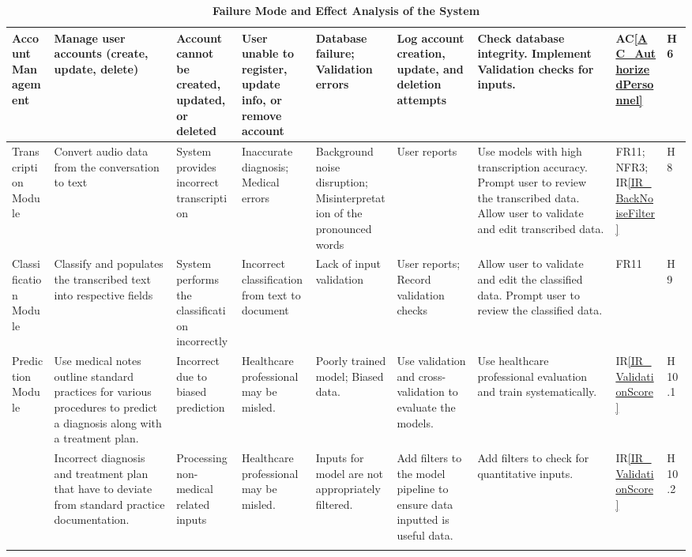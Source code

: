 \documentclass{article}
\begin{document}
\begin{landscape}
\begin{longtable}{|p{1.5cm}|p{2cm}|p{2.6cm}|p{2cm}|p{2cm}|p{2cm}|p{3.5cm}|p{1cm}|p{0.8cm}|}
        \midrule
        Account Management & \raggedright Manage user accounts (create, update, delete) & \raggedright Account cannot be created, updated, or deleted & \raggedright User unable to register, update info, or remove account & \raggedright Database failure; Validation errors & \raggedright Log account creation, update, and deletion attempts & \raggedright Check database integrity. Implement Validation checks for inputs. & AC\ref{AC_AuthorizedPersonnel} & H6 \\ 
        \midrule
        Transcription Module & \raggedright Convert audio data from the conversation to text & \raggedright System provides incorrect transcription & \raggedright Inaccurate diagnosis; Medical errors & \raggedright Background noise disruption; Misinterpretation of the pronounced words & \raggedright User reports & \raggedright Use models with high transcription accuracy. Prompt user to review the transcribed data. Allow user to validate and edit transcribed data. & FR11; NFR3; IR\ref{IR_BackNoiseFilter} & H8 \\ 
        \midrule
        Classification Module & \raggedright Classify and populates the transcribed text into respective fields & \raggedright System performs the classification incorrectly & \raggedright Incorrect classification from text to document & \raggedright Lack of input validation & \raggedright User reports; Record validation checks & \raggedright Allow user to validate and edit the classified data. Prompt user to review the classified data. & FR11 & H9 \\
        \midrule
        Prediction Module & \raggedright Use medical notes outline standard practices for various procedures to predict a diagnosis along with a treatment plan. & \raggedright Incorrect due to biased prediction & \raggedright Healthcare professional may be misled. & \raggedright Poorly trained model; Biased data. & \raggedright Use validation and cross-validation to evaluate the models. & \raggedright Use healthcare professional evaluation and train systematically. & IR\ref{IR_ValidationScore} & H10.1 \\
        \midrule
        & \raggedright Incorrect diagnosis and treatment plan that have to deviate from standard practice documentation. & \raggedright Processing non-medical related inputs & \raggedright Healthcare professional may be misled. & \raggedright Inputs for model are not appropriately filtered. & \raggedright Add filters to the model pipeline to ensure data inputted is useful data. & \raggedright Add filters to check for quantitative inputs. & IR\ref{IR_ValidationScore} & H10.2 \\ 
        \bottomrule
        \caption{\bf Failure Mode and Effect Analysis of the System}
    \end{longtable}
    
    
\end{landscape}
\end{document}
